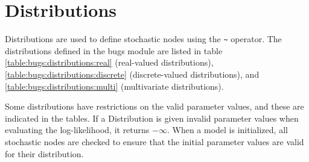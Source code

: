 \documentclass[11pt, a4paper, titlepage]{report}
\begin{document}
\chapter{Distributions}
\label{section:distributions}

Distributions are used to define stochastic nodes using the \verb+~+
operator. The distributions defined in the bugs module are listed in
table \ref{table:bugs:distributions:real} (real-valued distributions),
\ref{table:bugs:distributions:discrete} (discrete-valued
distributions), and \ref{table:bugs:distributions:multi}
(multivariate distributions).

Some distributions have restrictions on the valid parameter values,
and these are indicated in the tables. If a Distribution is
given invalid parameter values when evaluating the log-likelihood, it
returns $-\infty$. When a model is initialized, all stochastic nodes
are checked to ensure that the initial parameter values are valid for
their distribution.
\end{document}
